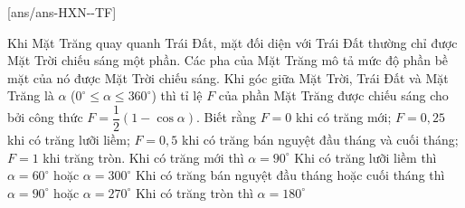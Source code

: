 \cauds
{}[ans/ans-HXN-\sode-TF]
% 
 \begin{ex}%
 Khi Mặt Trăng quay quanh Trái Đất, mặt đối diện với Trái Đất thường chỉ được Mặt Trời chiếu sáng một phần. Các pha của Mặt Trăng mô tả mức độ phần bề mặt của nó được Mặt Trời chiếu sáng. Khi góc giữa Mặt Trời, Trái Đất và Mặt Trăng là $\alpha$ ($0^\circ \le \alpha \le 360^\circ$) thì tỉ lệ $F$ của phần Mặt Trăng được chiếu sáng cho bởi công thức $F = \dfrac{1}{2}(1-\cos\alpha)$.
 Biết rằng $F = 0$ khi có trăng mới; $F = 0,25$ khi có trăng lưỡi liềm; $F = 0,5$ khi có trăng bán nguyệt đầu tháng và cuối tháng; $F = 1$ khi trăng tròn. 
 \choiceTF
 {Khi có trăng mới thì $\alpha = 90^\circ$}
 {\True Khi có trăng lưỡi liềm thì $\alpha = 60^\circ$ hoặc $\alpha = 300^\circ$}
 {\True Khi có trăng bán nguyệt đầu tháng hoặc cuối tháng thì $\alpha = 90^\circ$ hoặc $\alpha = 270^\circ$}
 {\True Khi có trăng tròn thì $\alpha = 180^\circ$}
 \end{ex}
% 
